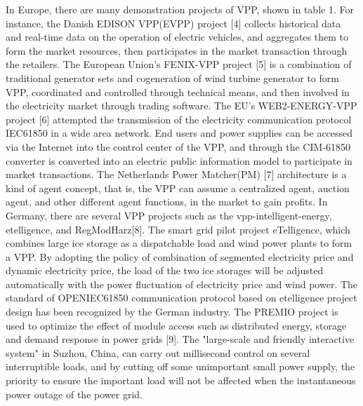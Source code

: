 \documentclass[twocolumn,a4paper]{IEEEtran}
\begin{document}
In Europe, there are many demonstration projects of VPP, shown in table 1. 
For instance, the Danish EDISON VPP(EVPP) project [4] collects historical data and real-time data on the operation of electric vehicles, and aggregates them to form the market resources, then participates in the market transaction through the retailers. 
The European Union's FENIX-VPP project [5] is a combination of traditional generator sets and cogeneration of wind turbine generator to form VPP, coordinated and controlled through technical means, and then involved in the electricity market through trading software. 
The EU's WEB2-ENERGY-VPP project [6] attempted the transmission of the electricity communication protocol IEC61850 in a wide area network. 
End users and power supplies can be accessed via the Internet into the control center of the VPP, and through the CIM-61850 converter is converted into an electric public information model to participate in market transactions. 
The Netherlands Power Matcher(PM) [7] architecture is a kind of agent concept, that is, the VPP can assume a centralized agent, auction agent, and other different agent functions, in the market to gain profits. 
In Germany, there are several VPP projects such as the vpp-intelligent-energy, etelligence, and RegModHarz[8]. 
The smart grid pilot project eTelligence, which combines large ice storage as a dispatchable load and wind power plants to form a VPP. 
By adopting the policy of combination of segmented electricity price and dynamic electricity price, the load of the two ice storages will be adjusted automatically with the power fluctuation of electricity price and wind power. 
The standard of OPENIEC61850 communication protocol based on etelligence project design has been recognized by the German industry. 
The PREMIO project is used to optimize the effect of module access such as distributed energy, storage and demand response in power grids [9]. 
The "large-scale and friendly interactive system" in Suzhou, China, can carry out millisecond control on several interruptible loads, and by cutting off some unimportant small power supply, the priority to ensure the important load will not be affected when the instantaneous power outage of the power grid. 
\end{document}
